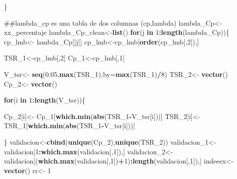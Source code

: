 \documentclass[]{article}
\newenvironment{Shaded}{\begin{snugshade}}{\end{snugshade}}
\newcommand{\KeywordTok}[1]{\textcolor[rgb]{0.13,0.29,0.53}{\textbf{#1}}}
\newcommand{\DataTypeTok}[1]{\textcolor[rgb]{0.13,0.29,0.53}{#1}}
\newcommand{\DecValTok}[1]{\textcolor[rgb]{0.00,0.00,0.81}{#1}}
\newcommand{\FloatTok}[1]{\textcolor[rgb]{0.00,0.00,0.81}{#1}}
\newcommand{\StringTok}[1]{\textcolor[rgb]{0.31,0.60,0.02}{#1}}
\newcommand{\ControlFlowTok}[1]{\textcolor[rgb]{0.13,0.29,0.53}{\textbf{#1}}}
\newcommand{\OperatorTok}[1]{\textcolor[rgb]{0.81,0.36,0.00}{\textbf{#1}}}
\newcommand{\NormalTok}[1]{#1}
\begin{document}
\begin{Shaded}
\begin{Highlighting}[]
{{{{{{{{{{{{\NormalTok{    \}}
    
    
    
    
\NormalTok{    ##lambda_cp es una tabla de dos columnas (cp,lambda) }
\NormalTok{    lambda_Cp<-}\StringTok{ }\NormalTok{xx_percentaje}
\NormalTok{    lambda_Cp_clean<-}\KeywordTok{list}\NormalTok{()}
    \ControlFlowTok{for}\NormalTok{(j }\ControlFlowTok{in} \DecValTok{1}\OperatorTok{:}\KeywordTok{length}\NormalTok{(lambda_Cp))\{}
\NormalTok{      cp_lmb<-}\StringTok{ }\NormalTok{lambda_Cp[[j]]}
\NormalTok{      cp_lmb<-cp_lmb[}\KeywordTok{order}\NormalTok{(cp_lmb[,}\DecValTok{2}\NormalTok{]),]}
      
      
\NormalTok{      TSR_}\DecValTok{1}\NormalTok{<-cp_lmb[,}\DecValTok{2}\NormalTok{]}
\NormalTok{      Cp_}\DecValTok{1}\NormalTok{<-cp_lmb[,}\DecValTok{1}\NormalTok{]}
      
\NormalTok{      V_tsr<-}\StringTok{ }\KeywordTok{seq}\NormalTok{(}\FloatTok{0.05}\NormalTok{,}\KeywordTok{max}\NormalTok{(TSR_}\DecValTok{1}\NormalTok{),}\DataTypeTok{by=}\KeywordTok{max}\NormalTok{(TSR_}\DecValTok{1}\NormalTok{)}\OperatorTok{/}\DecValTok{8}\NormalTok{)}
\NormalTok{      TSR_}\DecValTok{2}\NormalTok{<-}\StringTok{ }\KeywordTok{vector}\NormalTok{()}
\NormalTok{      Cp_}\DecValTok{2}\NormalTok{<-}\StringTok{ }\KeywordTok{vector}\NormalTok{()}
      
      \ControlFlowTok{for}\NormalTok{(i }\ControlFlowTok{in} \DecValTok{1}\OperatorTok{:}\KeywordTok{length}\NormalTok{(V_tsr))\{}
        
\NormalTok{        Cp_}\DecValTok{2}\NormalTok{[i]<-}\StringTok{ }\NormalTok{Cp_}\DecValTok{1}\NormalTok{[}\KeywordTok{which.min}\NormalTok{(}\KeywordTok{abs}\NormalTok{(TSR_}\DecValTok{1}\OperatorTok{-}\NormalTok{V_tsr[i]))]}
\NormalTok{        TSR_}\DecValTok{2}\NormalTok{[i]<-TSR_}\DecValTok{1}\NormalTok{[}\KeywordTok{which.min}\NormalTok{(}\KeywordTok{abs}\NormalTok{(TSR_}\DecValTok{1}\OperatorTok{-}\NormalTok{V_tsr[i]))]}
        
\NormalTok{      \}}
\NormalTok{      validacion<-}\KeywordTok{cbind}\NormalTok{(}\KeywordTok{unique}\NormalTok{(Cp_}\DecValTok{2}\NormalTok{),}\KeywordTok{unique}\NormalTok{(TSR_}\DecValTok{2}\NormalTok{))}
\NormalTok{      validacion_}\DecValTok{1}\NormalTok{<-}\StringTok{ }\NormalTok{validacion[}\DecValTok{1}\OperatorTok{:}\KeywordTok{which.max}\NormalTok{(validacion[,}\DecValTok{1}\NormalTok{]),]}
\NormalTok{      validacion_}\DecValTok{2}\NormalTok{<-}\StringTok{ }\NormalTok{validacion[(}\KeywordTok{which.max}\NormalTok{(validacion[,}\DecValTok{1}\NormalTok{])}\OperatorTok{+}\DecValTok{1}\NormalTok{)}\OperatorTok{:}\KeywordTok{length}\NormalTok{(validacion[,}\DecValTok{1}\NormalTok{]),]}
\NormalTok{      indeeex<-}\StringTok{ }\KeywordTok{vector}\NormalTok{()}
\NormalTok{      rr<-}\StringTok{ }\DecValTok{1} 
      
}}}}}}}}}}}}
\end{Highlighting}
\end{Shaded}
\end{document}
